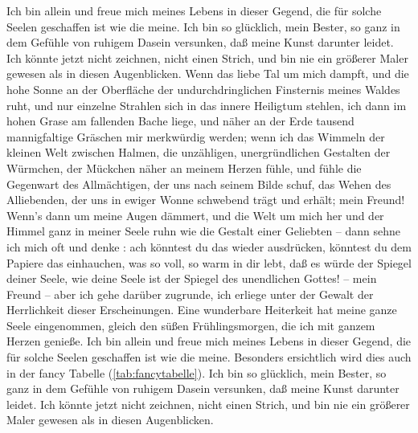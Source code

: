 \documentclass{scrreprt}
\begin{document}
    Ich bin allein und freue mich meines Lebens in dieser Gegend, die für solche Seelen geschaffen ist wie die meine. Ich bin so glücklich, mein Bester, so ganz in dem Gefühle von ruhigem Dasein versunken, daß meine Kunst darunter leidet. Ich könnte jetzt nicht zeichnen, nicht einen Strich, und bin nie ein größerer Maler gewesen als in diesen Augenblicken. Wenn das liebe Tal um mich dampft, und die hohe Sonne an der Oberfläche der undurchdringlichen Finsternis meines Waldes ruht, und nur einzelne Strahlen sich in das innere Heiligtum stehlen, ich dann im hohen Grase am fallenden Bache liege, und näher an der Erde tausend mannigfaltige Gräschen mir merkwürdig werden; wenn ich das Wimmeln der kleinen Welt zwischen Halmen, die unzähligen, unergründlichen Gestalten der Würmchen, der Mückchen näher an meinem Herzen fühle, und fühle die Gegenwart des Allmächtigen, der uns nach seinem Bilde schuf, das Wehen des Alliebenden, der uns in ewiger Wonne schwebend trägt und erhält; mein Freund! Wenn’s dann um meine Augen dämmert, und die Welt um mich her und der Himmel ganz in meiner Seele ruhn wie die Gestalt einer Geliebten – dann sehne ich mich oft und denke : ach könntest du das wieder ausdrücken, könntest du dem Papiere das einhauchen, was so voll, so warm in dir lebt, daß es würde der Spiegel deiner Seele, wie deine Seele ist der Spiegel des unendlichen Gottes! – mein Freund – aber ich gehe darüber zugrunde, ich erliege unter der Gewalt der Herrlichkeit dieser Erscheinungen. Eine wunderbare Heiterkeit hat meine ganze Seele eingenommen, gleich den süßen Frühlingsmorgen, die ich mit ganzem Herzen genieße. Ich bin allein und freue mich meines Lebens in dieser Gegend, die für solche Seelen geschaffen ist wie die meine. Besonders ersichtlich wird dies auch in der fancy Tabelle (\ref{tab:fancytabelle}). Ich bin so glücklich, mein Bester, so ganz in dem Gefühle von ruhigem Dasein versunken, daß meine Kunst darunter leidet. Ich könnte jetzt nicht zeichnen, nicht einen Strich, und bin nie ein größerer Maler gewesen als in diesen Augenblicken.
	
\end{document}
